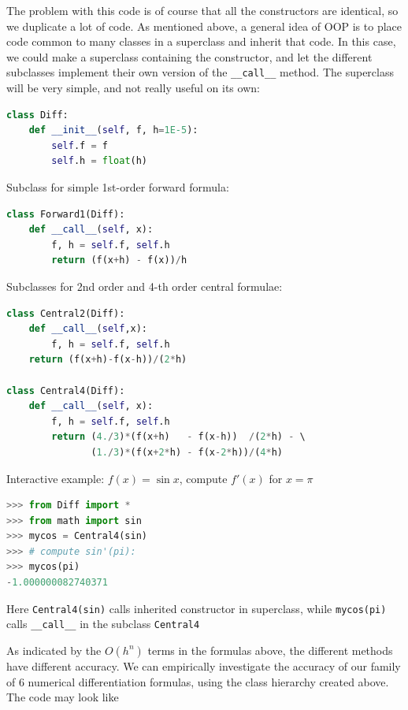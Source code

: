 \documentclass[graybox,envcountchap,sectrefs,final]{svmonodo}
\begin{document}
The problem with this code is of course that all the constructors are
identical, so we duplicate a lot of code. As mentioned above, a
general idea of OOP is to place
code common to many classes in a superclass and inherit that code.
In this case, we could make a superclass containing the constructor, and let the different subclasses
implement their own version of the \Verb!__call__! method. The superclass will be very simple, and not really useful on its own:
\begin{lstlisting}[language=Python,style=blue1]
class Diff:
    def __init__(self, f, h=1E-5):
        self.f = f
        self.h = float(h)
\end{lstlisting}
Subclass for simple 1st-order forward formula:
\begin{lstlisting}[language=Python,style=blue1]
class Forward1(Diff):
    def __call__(self, x):
        f, h = self.f, self.h
        return (f(x+h) - f(x))/h
\end{lstlisting}
Subclasses for 2nd order and 4-th order central formulae:
\begin{lstlisting}[language=Python,style=blue1]
class Central2(Diff):
    def __call__(self,x):
    	f, h = self.f, self.h
	return (f(x+h)-f(x-h))/(2*h)

class Central4(Diff):
    def __call__(self, x):
        f, h = self.f, self.h
        return (4./3)*(f(x+h)   - f(x-h))  /(2*h) - \ 
               (1./3)*(f(x+2*h) - f(x-2*h))/(4*h)
\end{lstlisting}

Interactive example: $f(x)=\sin x$, compute $f'(x)$ for $x=\pi$
\begin{lstlisting}[language=Python,style=blue1]
>>> from Diff import *
>>> from math import sin
>>> mycos = Central4(sin)
>>> # compute sin'(pi):
>>> mycos(pi)
-1.000000082740371
\end{lstlisting}
Here \texttt{Central4(sin)} calls inherited constructor in superclass,
while \texttt{mycos(pi)} calls \Verb!__call__! in the subclass \texttt{Central4}

As indicated by the $O(h^n)$ terms in the formulas above, the different methods have different
accuracy. We can empirically investigate the accuracy of our family of 6 numerical
differentiation formulas, using the class hierarchy created above. The code may look like
\begin{lstlisting}[language=Python,style=blue1]


\end{lstlisting}
\end{document}

